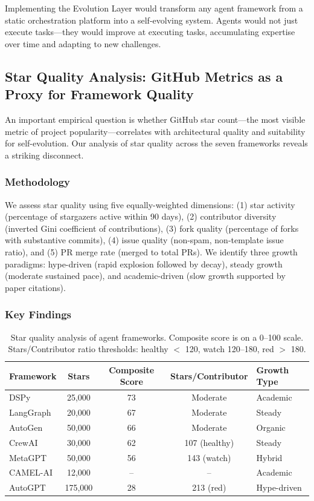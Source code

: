 Implementing the Evolution Layer would transform any agent framework from a static orchestration platform into a self-evolving system. Agents would not just execute tasks---they would improve at executing tasks, accumulating expertise over time and adapting to new challenges.


\subsection{Star Quality Analysis: GitHub Metrics as a Proxy for Framework Quality}
\label{sec:frameworks:quality}

An important empirical question is whether GitHub star count---the most visible metric of project popularity---correlates with architectural quality and suitability for self-evolution. Our analysis of star quality across the seven frameworks reveals a striking disconnect.

\subsubsection{Methodology}

We assess star quality using five equally-weighted dimensions: (1) star activity (percentage of stargazers active within 90 days), (2) contributor diversity (inverted Gini coefficient of contributions), (3) fork quality (percentage of forks with substantive commits), (4) issue quality (non-spam, non-template issue ratio), and (5) PR merge rate (merged to total PRs). We identify three growth paradigms: hype-driven (rapid explosion followed by decay), steady growth (moderate sustained pace), and academic-driven (slow growth supported by paper citations).

\subsubsection{Key Findings}

\begin{table}[t]
\centering
\small
\caption{Star quality analysis of agent frameworks. Composite score is on a 0--100 scale. Stars/Contributor ratio thresholds: healthy $<$ 120, watch 120--180, red $>$ 180.}
\label{tab:star_quality}
\begin{tabular}{lcccl}
\toprule
\textbf{Framework} & \textbf{Stars} & \textbf{Composite Score} & \textbf{Stars/Contributor} & \textbf{Growth Type} \\
\midrule
DSPy & 25,000 & 73 & Moderate & Academic \\
LangGraph & 20,000 & 67 & Moderate & Steady \\
AutoGen & 50,000 & 66 & Moderate & Organic \\
CrewAI & 30,000 & 62 & 107 (healthy) & Steady \\
MetaGPT & 50,000 & 56 & 143 (watch) & Hybrid \\
CAMEL-AI & 12,000 & -- & -- & Academic \\
AutoGPT & 175,000 & 28 & 213 (red) & Hype-driven \\
\bottomrule
\end{tabular}
\end{table}

